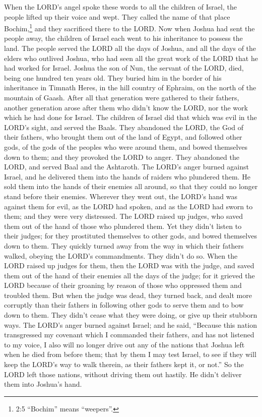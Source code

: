 \myverse{}When the LORD’s angel spoke these words to all the children of
Israel, the people lifted up their voice and wept.
\myverse{}They called the name of that place Bochim,\footnote{2:5 “Bochim” means “weepers”.} and they sacrificed there to the LORD.
\myverse{}Now when Joshua had sent the people away, the children of Israel each went to
his inheritance to possess the land.
\myverse{}The people served the LORD all the days of Joshua, and all the days of the elders
who outlived Joshua, who had seen all the great work of the LORD that he had worked for Israel.
\myverse{}Joshua the son of Nun, the servant of the LORD, died, being one hundred ten
years old.
\myverse{}They buried him in the border of his inheritance in Timnath Heres, in the hill
country of Ephraim, on the north of the mountain of Gaash.
\myverse{}After all that generation were gathered to their fathers, another generation
arose after them who didn’t know the LORD, nor the work which he had done for Israel.
\myverse{}The children of Israel did that which was evil in the LORD’s sight, and served
the Baals.
\myverse{}They abandoned the LORD, the God of their fathers, who brought them out of
the land of Egypt, and followed other gods, of the gods of the peoples who were around them, and bowed
themselves down to them; and they provoked the LORD to anger.
\myverse{}They abandoned the LORD, and served Baal and the Ashtaroth.
\myverse{}The LORD’s anger burned against Israel, and he delivered them into the hands
of raiders who plundered them. He sold them into the hands of their enemies all around, so that they could
no longer stand before their enemies.
\myverse{}Wherever they went out, the LORD’s hand was against them for evil, as the
LORD had spoken, and as the LORD had sworn to them; and they were very distressed.
\myverse{}The LORD raised up judges, who saved them out of the hand of those who plundered
them.
\myverse{}Yet they didn’t listen to their judges; for they prostituted themselves to
other gods, and bowed themselves down to them. They quickly turned away from the way in which their fathers
walked, obeying the LORD’s commandments. They didn’t do so.
\myverse{}When the LORD raised up judges for them, then the LORD was with the judge,
and saved them out of the hand of their enemies all the days of the judge; for it grieved the LORD because
of their groaning by reason of those who oppressed them and troubled them.
\myverse{}But when the judge was dead, they turned back, and dealt more corruptly than
their fathers in following other gods to serve them and to bow down to them. They didn’t cease what they
were doing, or give up their stubborn ways.
\myverse{}The LORD’s anger burned against Israel; and he said, “Because this nation
transgressed my covenant which I commanded their fathers, and has not listened to my voice,
\myverse{}I also will no longer drive out any of the nations that Joshua left when he
died from before them;
\myverse{}that by them I may test Israel, to see if they will keep the LORD’s way to
walk therein, as their fathers kept it, or not.”
\myverse{}So the LORD left those nations, without driving them out hastily. He didn’t
deliver them into Joshua’s hand.



